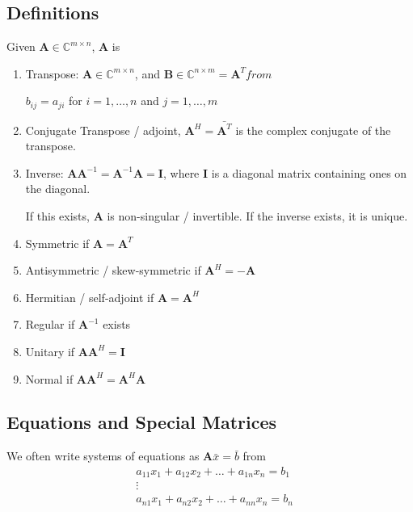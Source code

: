\documentclass[12pt]{article}
\newcommand{\ve}[1]{\ensuremath{\mathbf{#1}}}
\begin{document}
\subsection{Definitions}

Given $\ve{A} \in \mathbb{C}^{m \times n}$, \ve{A} is
%
\begin{enumerate}
\item Transpose: $\ve{A} \in \mathbb{C}^{m \times n}$, and $\ve{B} \in \mathbb{C}^{n \times m} = \ve{A}^T from$

$b_{	ij} = a_{ji}$ for $i = 1, \dots, n$ and $j = 1, \dots, m$

\item Conjugate Transpose / adjoint, $\ve{A}^H = \bar{\ve{A}^T}$ is the complex conjugate of the transpose. 

\item Inverse: $\ve{AA}^{-1} = \ve{A}^{-1}\ve{A} = \ve{I}$, where $\ve{I}$ is a diagonal matrix containing ones on the diagonal.

If this exists, $\ve{A}$ is non-singular / invertible. If the inverse exists, it is unique.

\item Symmetric if $\ve{A} = \ve{A}^T$

\item Antisymmetric / skew-symmetric if $\ve{A}^H = -\ve{A}$

\item Hermitian / self-adjoint if $\ve{A} = \ve{A}^H$

\item Regular if $\ve{A}^{-1}$ exists

\item Unitary if $\ve{A}\ve{A}^H = \ve{I}$

\item Normal if $\ve{A}\ve{A}^H = \ve{A}^H\ve{A}$
\end{enumerate}


\subsection{Equations and Special Matrices}

We often write systems of equations as $\ve{A}\bar{x} = \bar{b}$ from
\begin{align}
&a_{11} x_1 + a_{12} x_2 + \dots + a_{1n} x_n = b_1 \nonumber \\
&\vdots \nonumber \\
&a_{n1} x_1 + a_{n2} x_2 + \dots + a_{nn} x_n = b_n \nonumber
\end{align}
\end{document}
